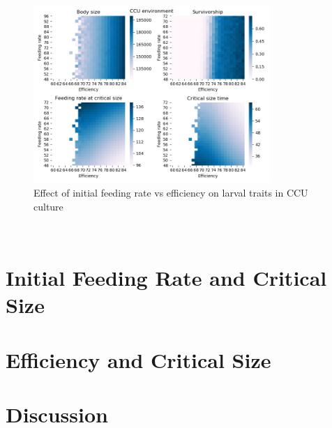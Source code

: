 \begin{figure}[h]
  \centering
  \includegraphics[width=0.8\textwidth]{C3/Figs/Feeding rate_vs_Efficiency_CCU}
  \caption{Effect of initial feeding rate vs efficiency on larval traits in CCU culture}
  \label{fig:fr vs eff ccu}
\end{figure}\\
\section{Initial Feeding Rate and Critical Size}

\section{Efficiency and Critical Size}

\section{Discussion}


\pagebreak
\renewcommand\bibname{{References}}


